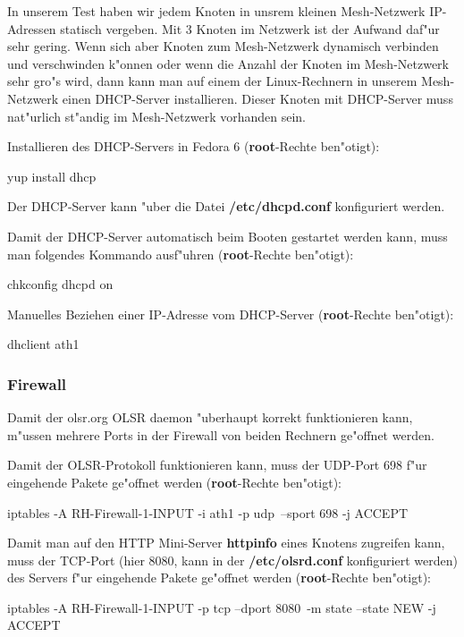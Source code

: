 In unserem Test haben wir jedem Knoten in unsrem kleinen Mesh-Netzwerk
IP-Adressen statisch vergeben. Mit 3 Knoten im Netzwerk ist der Aufwand daf"ur
sehr gering. Wenn sich aber Knoten zum Mesh-Netzwerk dynamisch verbinden
und verschwinden k"onnen oder wenn die Anzahl der Knoten im Mesh-Netzwerk
sehr gro"s wird, dann kann man auf einem der Linux-Rechnern in unserem
Mesh-Netzwerk einen DHCP-Server installieren. Dieser Knoten
mit DHCP-Server muss nat"urlich st"andig im Mesh-Netzwerk vorhanden sein.

Installieren des DHCP-Servers in Fedora 6 (\textbf{root}-Rechte ben"otigt):
\begin{shelllst}
yup install dhcp
\end{shelllst}

Der DHCP-Server kann "uber die Datei \textbf{/etc/dhcpd.conf} konfiguriert
werden.

Damit der DHCP-Server automatisch beim Booten gestartet werden kann,
muss man folgendes Kommando ausf"uhren (\textbf{root}-Rechte ben"otigt):
\begin{shelllst}
chkconfig dhcpd on
\end{shelllst}

Manuelles Beziehen einer IP-Adresse vom DHCP-Server
(\textbf{root}-Rechte ben"otigt):
\begin{shelllst}
dhclient ath1
\end{shelllst}

\subsubsection{Firewall}

Damit der olsr.org OLSR daemon "uberhaupt korrekt funktionieren kann,
m"ussen mehrere Ports in der Firewall von beiden Rechnern ge"offnet werden.

Damit der OLSR-Protokoll funktionieren kann, muss der UDP-Port 698
f"ur eingehende Pakete ge"offnet werden (\textbf{root}-Rechte ben"otigt):
\begin{shelllst}
iptables -A RH-Firewall-1-INPUT -i ath1 -p udp\
	--sport 698 -j ACCEPT
\end{shelllst}

Damit man auf den HTTP Mini-Server \textbf{httpinfo} eines Knotens zugreifen
kann, muss der TCP-Port
(hier 8080, kann in der \textbf{/etc/olsrd.conf} konfiguriert werden)
des Servers f"ur eingehende Pakete ge"offnet werden
(\textbf{root}-Rechte ben"otigt):
\begin{shelllst}
iptables -A RH-Firewall-1-INPUT -p tcp --dport 8080\
	-m state --state NEW -j ACCEPT
\end{shelllst}

